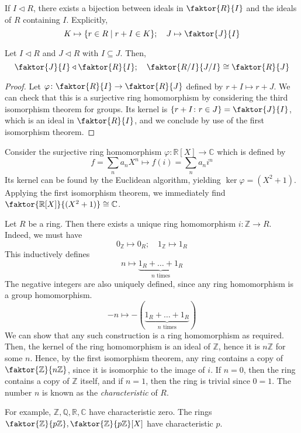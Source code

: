 \begin{remark}
	If \( I \triangleleft R \), there exists a bijection between ideals in \( \faktor{R}{I} \) and the ideals of \( R \) containing \( I \).
	Explicitly,
	\[
		K \mapsto \qty{r \in R \mid r + I \in K};\quad J \mapsto \faktor{J}{I}
	\]
\end{remark}
\begin{theorem}
	Let \( I \triangleleft R \) and \( J \triangleleft R \) with \( I \subseteq J \).
	Then,
	\[
		\faktor{J}{I} \triangleleft \faktor{R}{I};\quad \faktor{R/I}{J/I} \cong \faktor{R}{J}
	\]
\end{theorem}
\begin{proof}
	Let \( \varphi \colon \faktor{R}{I} \to \faktor{R}{J} \) defined by \( r+I \mapsto r+J \).
	We can check that this is a surjective ring homomorphism by considering the third isomorphism theorem for groups.
	Its kernel is \( \qty{r + I \colon r \in J} = \faktor{J}{I} \), which is an ideal in \( \faktor{R}{I} \), and we conclude by use of the first isomorphism theorem.
\end{proof}
\begin{example}
	Consider the surjective ring homomorphism \( \varphi \colon \mathbb R[X] \to \mathbb C \) which is defined by
	\[
		f = \sum_n a_n X^n \mapsto f(i) = \sum_n a_n i^n
	\]
	Its kernel can be found by the Euclidean algorithm, yielding \( \ker \varphi = (X^2 + 1) \).
	Applying the first isomorphism theorem, we immediately find \( \faktor{\mathbb R[X]}{(X^2 + 1)} \cong \mathbb C \).
\end{example}
\begin{example}
	Let \( R \) be a ring.
	Then there exists a unique ring homomorphism \( i \colon \mathbb Z \to R \).
	Indeed, we must have
	\[
		0_{\mathbb Z} \mapsto 0_R;\quad 1_{\mathbb Z} \mapsto 1_R
	\]
	This inductively defines
	\[
		n \mapsto \underbrace{1_R + \dots + 1_R}_{n \text{ times}}
	\]
	The negative integers are also uniquely defined, since any ring homomorphism is a group homomorphism.
	\[
		-n \mapsto -(\underbrace{1_R + \dots + 1_R}_{n \text{ times}})
	\]
	We can show that any such construction is a ring homomorphism as required.
	Then, the kernel of the ring homomorphism is an ideal of \( \mathbb Z \), hence it is \( n\mathbb Z \) for some \( n \).
	Hence, by the first isomorphism theorem, any ring contains a copy of \( \faktor{\mathbb Z}{n\mathbb Z} \), since it is isomorphic to the image of \( i \).
	If \( n = 0 \), then the ring contains a copy of \( \mathbb Z \) itself, and if \( n = 1 \), then the ring is trivial since \( 0 = 1 \).
	The number \( n \) is known as the \textit{characteristic} of \( R \).

	For example, \( \mathbb Z, \mathbb Q, \mathbb R, \mathbb C \) have characteristic zero.
	The rings \( \faktor{\mathbb Z}{p \mathbb Z}, \faktor{\mathbb Z}{p \mathbb Z}[X] \) have characteristic \( p \).
\end{example}

